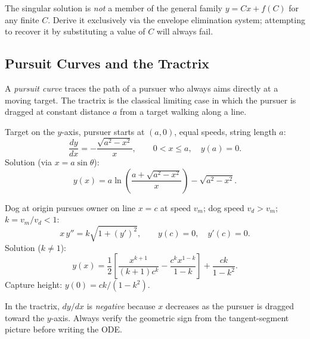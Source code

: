 \begin{warningbox}
The singular solution is \emph{not} a member of the general family $y = Cx + f(C)$
for any finite $C$. Derive it exclusively via the envelope elimination system;
attempting to recover it by substituting a value of $C$ will always fail.
\end{warningbox}

\subsection{Pursuit Curves and the Tractrix}

A \emph{pursuit curve} traces the path of a pursuer who always aims directly at
a moving target. The tractrix is the classical limiting case in which the
pursuer is dragged at constant distance $a$ from a target walking along a line.

\begin{formulabox}
Target on the $y$-axis, pursuer starts at $(a,0)$, equal speeds, string length $a$:
\[
  \frac{dy}{dx} = -\frac{\sqrt{a^2 - x^2}}{x}, \qquad 0 < x \le a,\quad y(a) = 0.
\]
Solution (via $x = a\sin\theta$):
\[
  y(x) = a\ln\!\left(\frac{a + \sqrt{a^2 - x^2}}{x}\right) - \sqrt{a^2 - x^2}.
\]
\end{formulabox}

\begin{formulabox}
Dog at origin pursues owner on line $x = c$ at speed $v_m$; dog speed $v_d > v_m$;
$k = v_m/v_d < 1$:
\[
  x\,y'' = k\sqrt{1+(y')^2}, \qquad y(c) = 0,\quad y'(c) = 0.
\]
Solution ($k \ne 1$):
\[
  y(x) = \frac{1}{2}\!\left[\frac{x^{k+1}}{(k+1)c^k}
  - \frac{c^k x^{1-k}}{1-k}\right] + \frac{ck}{1-k^2}.
\]
Capture height: $y(0) = ck/(1-k^2)$.
\end{formulabox}

\begin{warningbox}
In the tractrix, $dy/dx$ is \emph{negative} because $x$ decreases as the pursuer
is dragged toward the $y$-axis. Always verify the geometric sign from the
tangent-segment picture before writing the ODE.
\end{warningbox}

